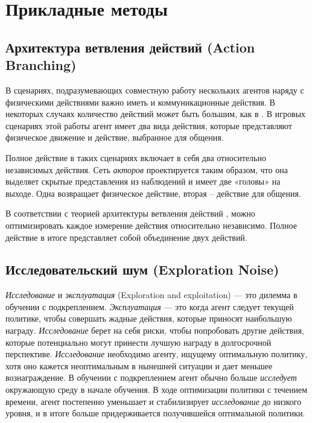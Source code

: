 \section{Прикладные методы}

\subsection{Архитектура ветвления действий (Action Branching)}

В сценариях, подразумевающих совместную работу нескольких агентов наряду с физическими действиями важно иметь и коммуникационные действия. В некоторых случаях количество действий может быть большим, как в \cite{tavakoli2017action}. В игровых сценариях этой работы агент имеет два вида действия, которые представляют физическое движение и действие, выбранное для общения.

Полное действие в таких сценариях включает в себя два относительно независимых действия. Сеть \textit{акторов} проектируется таким образом, что она выделяет скрытые представления из наблюдений и имеет две «головы» на выходе. Одна возвращает физическое действие, вторая – действие для общения.

В соответствии с теорией архитектуры ветвления действий \cite{tavakoli2017action}, можно оптимизировать каждое измерение действия относительно независимо. Полное действие в итоге представляет собой объединение двух действий.

\subsection{Исследовательский шум (Exploration Noise)}

\textit{Исследование} и \textit{эксплуатация} (Exploration and exploitation) — это дилемма в обучении с подкреплением. \textit{Эксплуатация} — это когда агент следует текущей политике, чтобы совершать жадные действия, которые приносят наибольшую награду. \textit{Исследование} берет на себя риски, чтобы попробовать другие действия, которые потенциально могут принести лучшую награду в долгосрочной перспективе. \textit{Исследование} необходимо агенту, ищущему оптимальную политику, хотя оно кажется неоптимальным в нынешней ситуации и дает меньшее вознаграждение. В обучении с подкреплением агент обычно больше \textit{исследует} окружающую среду в начале обучения. В ходе оптимизации политики с течением времени, агент постепенно уменьшает и стабилизирует \textit{исследование} до низкого уровня, и в итоге больше придерживается получившейся оптимальной политики.

